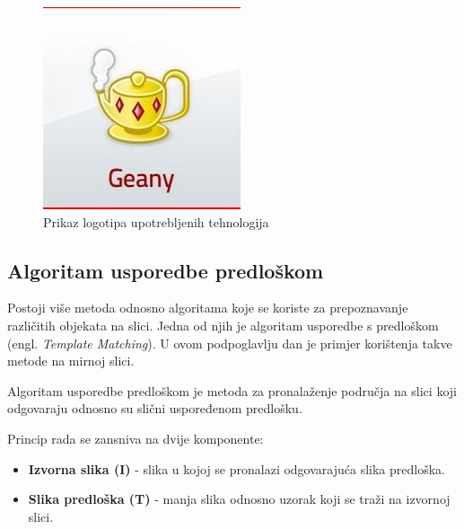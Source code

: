 \begin{figure}[!htb]
\endminipage\hfill
{}%
    \includegraphics[width=\linewidth]{figures/geany.jpg}
\endminipage
\caption{Prikaz logotipa upotrebljenih tehnologija}
\end{figure}


\newpage

\subsection{Algoritam usporedbe predloškom} %
\label{sub:Algoritam usporedbe predloškom}

Postoji više metoda odnosno algoritama koje se koriste za prepoznavanje
različitih objekata na slici. Jedna od njih je algoritam usporedbe s
predloškom (engl. \textit{Template Matching}). U ovom podpoglavlju dan
je primjer korištenja takve metode na mirnoj slici. 

Algoritam usporedbe predloškom je metoda za pronalaženje područja na
slici koji odgovaraju odnosno su slični uspoređenom predlošku. 

Princip rada se zansniva na dvije komponente:
\begin{itemize}
    \item \textbf{Izvorna slika (I)} - slika u kojoj se pronalazi
        odgovarajuća slika predloška.
    \item \textbf{Slika predloška (T)} - manja slika odnosno uzorak koji
        se traži na izvornoj slici.
\end{itemize}

